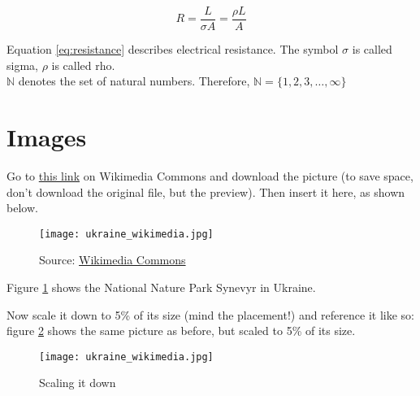 \documentclass[a4paper]{article}
\begin{document}
\begin{equation} \label{eq:resistance}
    R = \frac{L}{{\sigma A}} = \frac{{\rho L}}{A}
\end{equation}	

\noindent Equation \ref{eq:resistance} describes electrical resistance. The symbol $\sigma$ is called sigma, $\rho$ is called rho.\\

\noindent $\mathbb{N}$ denotes the set of natural numbers. Therefore, $ \mathbb{N}=\{1,2,3,\ldots,\infty\} $

\newpage

\section*{Images}

Go to \href{https://commons.wikimedia.org/wiki/Category:Featured_pictures_of_Ukraine#/media/File:21-224-5054_NNP_Synevyr_RB_18.jpg}{this link} on Wikimedia Commons and download the picture (to save space, don't download the original file, but the preview). Then insert it here, as shown below.
\begin{figure}[h!]
    \centering
    \texttt{[image: ukraine\_wikimedia.jpg]}
    \caption{Source: \href{https://commons.wikimedia.org/wiki/File:21-224-5054_NNP_Synevyr_RB_18.jpg}{Wikimedia Commons}}
    \label{fig:ukraine_wikimedia}
\end{figure}

Figure \ref{fig:ukraine_wikimedia} shows the National Nature Park Synevyr in Ukraine.

\newpage

Now scale it down to 5\% of its size (mind the placement!) and reference it like so: figure \ref{fig:ukraine_wikimedia_scaled} shows the same picture as before, but scaled to 5\% of its size.

\begin{figure}[b]
    \centering
    \texttt{[image: ukraine\_wikimedia.jpg]}
    \caption{Scaling it down}
    \label{fig:ukraine_wikimedia_scaled}
\end{figure}

		
\end{document}
